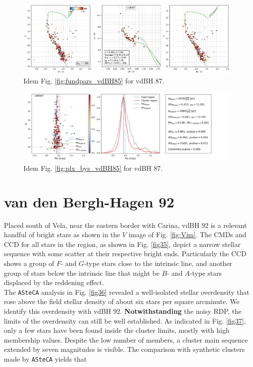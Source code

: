 \documentclass[draft]{aa}
\begin{document}
\begin{figure}[ht]
    \centering
    \includegraphics[width=\hsize]{../figs/cmds_vdbh87.png}
    \caption{Idem Fig. \ref{fig:fundpars_vdBH85} for vdBH 87.}
    \label{fig17}
\end{figure}
\begin{figure}[ht]
    \centering
    \includegraphics[width=\hsize]{../figs/plx_vdBH87.png}
    \caption{Idem Fig. \ref{fig:plx_bys_vdBH85} for vdBH 87.}
    \label{fig18}
\end{figure}




\section{van den Bergh-Hagen 92}

Placed south of Vela, near the eastern border with Carina, vdBH
92 is a relevant handful of bright stars as shown in the $V$ image of Fig.
\ref{fig:Vim}. The CMDs and CCD for all stars in the region, as shown in Fig.
\ref{fig35}, depict a narrow stellar sequence with some scatter at their respective
bright ends. Particularly the CCD shows a
group of $F$- and $G$-type stars close to the intrinsic line, and another group of stars below the intrinsic
line that might be $B$- and $A$-type stars displaced by the reddening effect.\\

The \texttt{ASteCA} analysis in Fig. \ref{fig36} revealed a
well-isolated stellar overdensity that rose above the field stellar density of
about six stars per square arcminute. We identify this overdensity with vdBH
92. \textbf{Notwithstanding} the noisy RDP, the limits of the overdensity can
still be well established. As indicated in Fig. \ref{fig37}, only a few stars
have been found inside the cluster limits, mostly with high membership values.
Despite the low number of members, a cluster main sequence extended by seven
magnitudes is visible. The comparison with synthetic clusters made by 
\texttt{ASteCA} yields that
\end{document}
